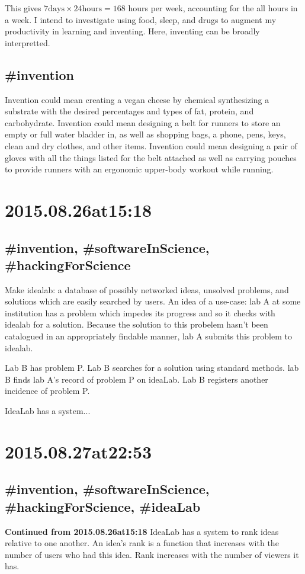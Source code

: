 This gives $7 \text{days} \times 24 \text{hours} = 168$ hours per week, accounting for the all hours in a week. I intend to investigate using food, sleep, and drugs to augment my productivity in learning and inventing. Here, inventing can be broadly interpretted.

\subsection*{\#invention}
Invention could mean creating a vegan cheese by chemical synthesizing a substrate with the desired percentages and types of fat, protein, and carbohydrate. Invention could mean designing a belt for runners to store an empty or full water bladder in, as well as shopping bags, a phone, pens, keys, clean and dry clothes, and other items. Invention could mean designing a pair of gloves with all the things listed for the belt attached as well as carrying pouches to provide runners with an ergonomic upper-body workout while running.

\section*{2015.08.26at15:18}
\subsection*{\#invention, \#softwareInScience, \#hackingForScience}
Make idealab: a database of possibly networked ideas, unsolved problems, and solutions which are easily searched by users. An idea of a use-case: lab A at some institution has a problem which impedes its progress and so it checks with idealab for a solution. Because the solution to this probelem hasn't been catalogued in an appropriately findable manner, lab A submits this problem to idealab.

Lab B has problem P. Lab B searches for a solution using standard methods. lab B finds lab A's record of problem P on ideaLab. Lab B registers another incidence of problem P.

IdeaLab has a system...

\section*{2015.08.27at22:53}
\subsection*{\#invention, \#softwareInScience, \#hackingForScience, \#ideaLab}
{\bf Continued from 2015.08.26at15:18}
IdeaLab has a system to rank ideas relative to one another. An idea's rank is a function that increases with the number of users who had this idea. Rank increases with the number of viewers it has.


